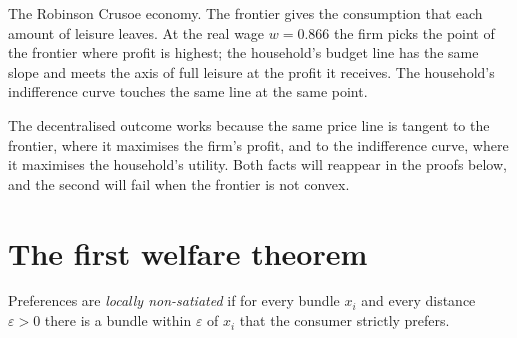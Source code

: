 \begin{omfigure}

{\small The Robinson Crusoe economy. The frontier gives the consumption that each amount of leisure
leaves. At the real wage $w = 0.866$ the firm picks the point of the frontier where profit is highest;
the household's budget line has the same slope and meets the axis of full leisure at the profit it
receives. The household's indifference curve touches the same line at the same point.}
\end{omfigure}

The decentralised outcome works because the same price line is tangent to the frontier, where it
maximises the firm's profit, and to the indifference curve, where it maximises the household's utility.
Both facts will reappear in the proofs below, and the second will fail when the frontier is not convex.

\section{The first welfare theorem}\label{sec:b2:welfare-theorems:first}

\begin{definition}\label{def:b2:welfare-theorems:lns}
Preferences are \emph{locally non-satiated} if for every bundle $x_i$ and
every distance $\varepsilon > 0$ there is a bundle within $\varepsilon$ of $x_i$ that the consumer
strictly prefers.
\end{definition}

